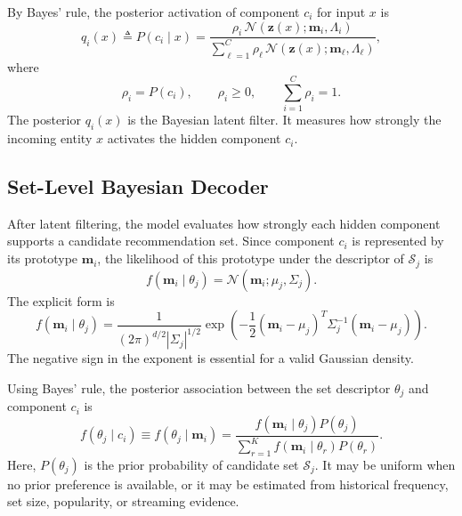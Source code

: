 \documentclass{article}
\theoremstyle{plain}
\theoremstyle{definition}
\theoremstyle{remark}
\begin{document}
By Bayes' rule, the posterior activation of component \(c_i\) for input \(x\) is
\begin{equation}
	\label{eq:posterior_component}
	q_i(x)
	\triangleq
	P(c_i\mid x)
	=
	\frac{
		\rho_i\,
		\mathcal N(\mathbf z(x);\mathbf m_i,\Lambda_i)
	}{
		\sum_{\ell=1}^{C}
		\rho_\ell\,
		\mathcal N(\mathbf z(x);\mathbf m_\ell,\Lambda_\ell)
	},
\end{equation}
where
\[
\rho_i=P(c_i),
\qquad
\rho_i\geq 0,
\qquad
\sum_{i=1}^{C}\rho_i=1.
\]
The posterior \(q_i(x)\) is the Bayesian latent filter. It measures how strongly the incoming entity \(x\) activates the hidden component \(c_i\).

\subsection{Set-Level Bayesian Decoder}
\label{subsec:set_decoder}

After latent filtering, the model evaluates how strongly each hidden component supports a candidate recommendation set. Since component \(c_i\) is represented by its prototype \(\mathbf m_i\), the likelihood of this prototype under the descriptor of \(\mathcal S_j\) is
\begin{equation}
	\label{eq:prototype_likelihood}
	f(\mathbf m_i\mid\theta_j)
	=
	\mathcal N(\mathbf m_i;\mu_j,\Sigma_j).
\end{equation}
The explicit form is
\begin{equation}
	\label{eq:prototype_likelihood_expanded}
	f(\mathbf m_i\mid\theta_j)
	=
	\frac{1}{(2\pi)^{d/2}|\Sigma_j|^{1/2}}
	\exp\left(
	-\frac{1}{2}
	(\mathbf m_i-\mu_j)^T
	\Sigma_j^{-1}
	(\mathbf m_i-\mu_j)
	\right).
\end{equation}
The negative sign in the exponent is essential for a valid Gaussian density.

Using Bayes' rule, the posterior association between the set descriptor \(\theta_j\) and component \(c_i\) is
\begin{equation}
	\label{eq:posterior_set}
	f(\theta_j\mid c_i)
	\equiv
	f(\theta_j\mid\mathbf m_i)
	=
	\frac{
		f(\mathbf m_i\mid\theta_j)P(\theta_j)
	}{
		\sum_{r=1}^{K}
		f(\mathbf m_i\mid\theta_r)P(\theta_r)
	}.
\end{equation}
Here, \(P(\theta_j)\) is the prior probability of candidate set \(\mathcal S_j\). It may be uniform when no prior preference is available, or it may be estimated from historical frequency, set size, popularity, or streaming evidence.
\end{document}
